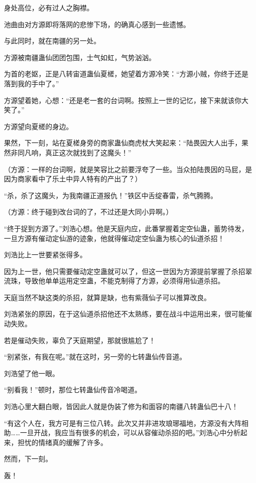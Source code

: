 \begin{this_body}
身处高位，必有过人之胸襟。

池曲由对方源即将落网的悲惨下场，的确真心感到一些遗憾。

与此同时，就在南疆的另一处。

方源被南疆蛊仙团团包围，士气如虹，气势汹汹。

为首的老妪，正是八转宙道蛊仙夏槎，她望着方源冷笑：“方源小贼，你终于还是落到我的手中了。”

方源望着她，心想：“还是老一套的台词啊。按照上一世的记忆，接下来就该你大笑了。”

方源望向夏槎的身边。

果然，下一刻，站在夏槎身旁的商家蛊仙商虎杖大笑起来：“陆畏因大人出手，果然非同凡响，真正这次就找到了这魔头！”

（方源：一样的台词啊，就是笑容比之前要浮夸了一些。当众拍陆畏因的马屁，是因为商家看中了乐土中异人特有的产出了？）

“杀，杀了这魔头，为我南疆正道报仇！”铁区中舌绽春雷，杀气腾腾。

（方源：终于碰到改台词的了，不过还是大同小异啊。）

“终于捉到方源了。”刘浩心想。他是天庭内应，此番掌握着定空仙蛊，蓄势待发，一旦方源有催动定仙游的迹象，他就得催动定空仙蛊为核心的仙道杀招！

刘浩比上一世要紧张得多。

因为上一世，他只需要催动定空蛊就可以了，但这一世因为方源提前掌握了杀招翠流珠，导致他单单运用定空蛊，不能克制得了方源，必须得用仙道杀招。

天庭当然不缺这类的杀招，就算是缺，也有紫薇仙子可以推算改良。

刘浩紧张的原因，在于这仙道杀招他还不太熟练，要在战斗中运用出来，很可能催动失败。

若是催动失败，辜负了天庭期望，那就很尴尬了！

“别紧张，有我在呢。”就在这时，另一旁的七转蛊仙传音道。

刘浩望了他一眼。

“别看我！”顿时，那位七转蛊仙传音冷喝道。

刘浩心里大翻白眼，皆因此人就是伪装了修为和面容的南疆八转蛊仙巴十八！

“有这个人在，我方可是有三位八转。此次又并非进攻琅琊福地，方源没有大阵相助……一旦开战，我应当有很多的机会，可以从容催动杀招的吧。”刘浩心中分析起来，担忧的情绪真的缓解了许多。

然而，下一刻。

轰！


\end{this_body}
